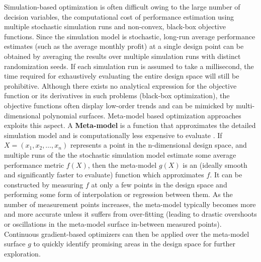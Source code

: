 Simulation-based optimization is often difficult owing to the large number of decision variables, the computational cost of performance estimation using multiple stochastic simulation runs and non-convex, black-box objective functions.  
Since the simulation model is stochastic, long-run average performance estimates (such as the average monthly profit) at a single design point can be obtained by averaging the results over multiple simulation runs with distinct randomization seeds. If each simulation run is assumed to take a millisecond, the time required for exhaustively evaluating the entire design space will still be prohibitive. Although there exists no analytical expression for the objective function or its derivatives in such problems (black-box optimization), the objective functions often display low-order trends and can be mimicked by multi-dimensional polynomial surfaces. Meta-model based optimization approaches exploits this aspect.
%
A \textbf{Meta-model} is a function that approximates the detailed simulation model and is computationally less expensive to evaluate \cite{barton2020tutorial}. If $X = (x_1, x_2, \dots, x_n)$ represents a point in the n-dimensional design space, and multiple runs of the the stochastic simulation model estimate some average performance metric $f(X)$, then the meta-model $g(X)$ is an (ideally smooth and significantly faster to evaluate) function which approximates $f$.  It can be constructed by measuring $f$ at only a few  points in the design space and performing some form of interpolation or regression between them. As the number of measurement points increases, the meta-model typically becomes more and more accurate unless it suffers from over-fitting (leading to drastic overshoots or oscillations in the meta-model surface in-between measured points). Continuous gradient-based optimizers can then be applied over the meta-model surface $g$ to quickly identify promising areas in the design space for further exploration.  
% 

